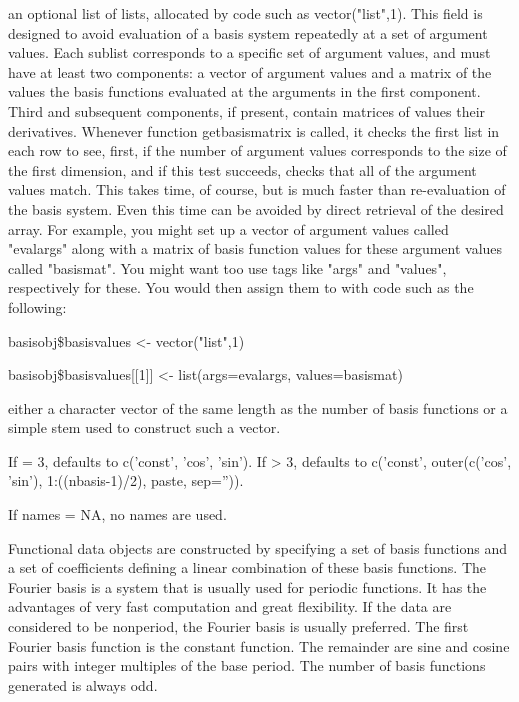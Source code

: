 \documentclass{article}
\begin{document}
\begin{Arguments}
\begin{ldescription}
\item[\code{basisvalues}] an optional list of lists, allocated by code such as
vector("list",1).  This field is designed to avoid evaluation of a
basis system repeatedly at a set of argument values.  Each sublist
corresponds to a specific set of argument values, and must have at
least two components:  a vector of argument values and a matrix of
the values the basis functions evaluated at the arguments in the
first component.  Third and subsequent components, if present,
contain matrices of values their derivatives.  Whenever function
getbasismatrix is called, it checks the first list in each row to
see, first, if the number of argument values corresponds to the size
of the first dimension, and if this test succeeds, checks that all
of the argument values match.  This takes time, of course, but is
much faster than re-evaluation of the basis system.  Even this time
can be avoided by direct retrieval of the desired array.  For
example, you might set up a vector of argument values called
"evalargs" along with a matrix of basis function values for these
argument values called "basismat".  You might want too use tags like
"args" and "values", respectively for these.  You would then assign
them to  with code such as the following:

basisobj\$basisvalues <- vector("list",1)

basisobj\$basisvalues[[1]] <- list(args=evalargs,
values=basismat)

\item[\code{names}] either a character vector of the same length as the number of basis
functions or a simple stem used to construct such a vector.

If  = 3,  defaults to c('const', 'cos',
'sin').  If  > 3,  defaults to c('const',
outer(c('cos', 'sin'), 1:((nbasis-1)/2), paste, sep='')).

If names = NA, no names are used.

\end{ldescription}
\end{Arguments}
\begin{Details}\relax
Functional data objects are constructed by specifying a set of basis
functions and a set of coefficients defining a linear combination of
these basis functions.  The Fourier basis is a system
that is usually used for periodic functions.  It has the advantages
of very fast computation and great flexibility.   If the data are
considered to be nonperiod, the Fourier basis is usually preferred.
The first Fourier basis function is the constant function.  The
remainder are sine and cosine pairs with integer multiples of the
base period. The number of basis functions generated is always odd.
\end{Details}
\end{document}
